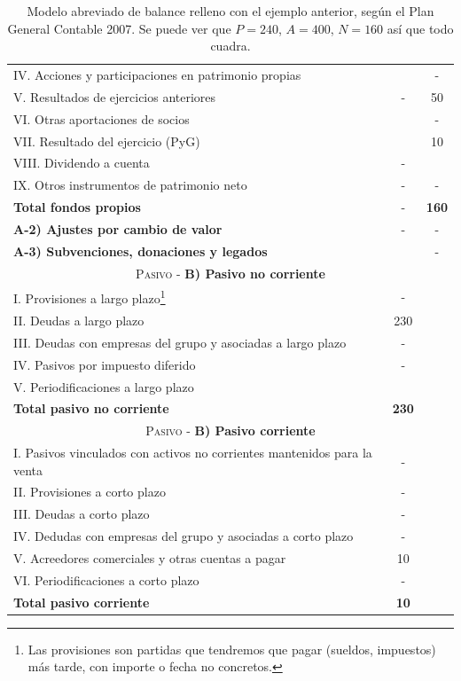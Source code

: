 \documentclass[nochap,palatino,shortheader]{apuntes}
\begin{document}
\begin{table}[hbtp]
\begin{minipage}{\textwidth}
\begin{tabular}{l|c|c}
IV. Acciones y participaciones en patrimonio propias & & - \\
V. Resultados de ejercicios anteriores & - & 50 \\
VI. Otras aportaciones de socios & & - \\
VII. Resultado del ejercicio (PyG) & & 10 \\
VIII. Dividendo a cuenta & - &\\
IX. Otros instrumentos de patrimonio neto & - & - \\
\textbf{Total fondos propios} & - &  \textbf{160} \\
\textbf{A-2) Ajustes por cambio de valor} & - & - \\
\textbf{A-3) Subvenciones, donaciones y legados} & & - \\ \midrule
\multicolumn{3}{c}{\textsc{Pasivo} - \textbf{B) Pasivo no corriente}} \\ \midrule
I. Provisiones a largo plazo\footnote{Las provisiones son partidas que tendremos que pagar (sueldos, impuestos) más tarde, con importe o fecha no concretos.} & - &  \\
II. Deudas a largo plazo & 230 & \\
III. Deudas con empresas del grupo y asociadas a largo plazo & - &  \\
IV. Pasivos por impuesto diferido & - &  \\
V. Periodificaciones a largo plazo &  & \\
\textbf{Total pasivo no corriente} & \textbf{230} &  \\ \midrule
\multicolumn{3}{c}{\textsc{Pasivo} - \textbf{B) Pasivo corriente}} \\ \midrule
I. Pasivos vinculados con activos no corrientes mantenidos para la venta & - & \\
II. Provisiones a corto plazo & - & \\
III. Deudas a corto plazo  & - & \\
IV. Dedudas con empresas del grupo y asociadas a corto plazo & - & \\
V. Acreedores comerciales y otras cuentas a pagar & 10 & \\
VI. Periodificaciones a corto plazo & - & \\
\textbf{Total pasivo corriente} & \textbf{10} &  \\ \midrule
\end{tabular}
\caption{Modelo abreviado de balance relleno con el ejemplo anterior, según el Plan General Contable 2007. Se puede ver que $P = 240$, $A = 400$, $N = 160$ así que todo cuadra.}
\label{tab:Balance}
\end{minipage}
\end{table}
\end{document}
